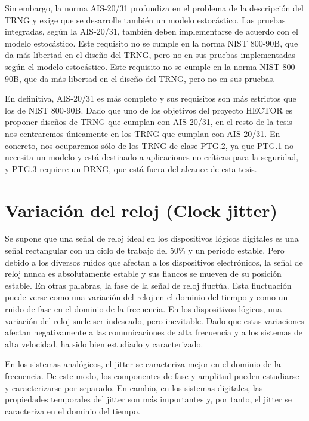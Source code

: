 	Sin embargo, la norma AIS-20/31 profundiza en el problema de la descripción del TRNG y exige que se desarrolle también un modelo estocástico. Las pruebas integradas, según la AIS-20/31, también deben implementarse de acuerdo con el modelo estocástico. Este requisito no se cumple en la norma NIST 800-90B, que da más libertad en el diseño del TRNG, pero no en sus pruebas implementadas según el modelo estocástico. Este requisito no se cumple en la norma NIST 800-90B, que da más libertad en el diseño del TRNG, pero no en sus pruebas.
	
	En definitiva, AIS-20/31 es más completo y sus requisitos son más estrictos que los de NIST 800-90B. Dado que uno de los objetivos del proyecto HECTOR es proponer diseños de TRNG que cumplan con AIS-20/31, en el resto de la tesis nos centraremos únicamente en los TRNG que cumplan con AIS-20/31. En concreto, nos ocuparemos sólo de los TRNG de clase PTG.2, ya que PTG.1 no necesita un modelo y está destinado a aplicaciones no críticas para la seguridad, y PTG.3 requiere un DRNG, que está fuera del alcance de esta tesis.	












	
	\section{Variación del reloj (Clock jitter)}
	
	Se supone que una señal de reloj ideal en los dispositivos lógicos digitales es una señal rectangular con un ciclo de trabajo del 50\% y un periodo estable. Pero debido a los diversos ruidos que afectan a los dispositivos electrónicos, la señal de reloj nunca es absolutamente estable y sus flancos se mueven de su posición estable. En otras palabras, la fase de la señal de reloj fluctúa. Esta fluctuación puede verse como una variación del reloj en el dominio del tiempo y como un ruido de fase en el dominio de la frecuencia. En los dispositivos lógicos, una variación del reloj suele ser indeseado, pero inevitable. Dado que estas variaciones afectan negativamente a las comunicaciones de alta frecuencia y a los sistemas de alta velocidad, ha sido bien estudiado y caracterizado.
	
	En los sistemas analógicos, el jitter se caracteriza mejor en el dominio de la frecuencia. De este modo, los componentes de fase y amplitud pueden estudiarse y caracterizarse por separado. En cambio, en los sistemas digitales, las propiedades temporales del jitter son más importantes y, por tanto, el jitter se caracteriza en el dominio del tiempo.
	

